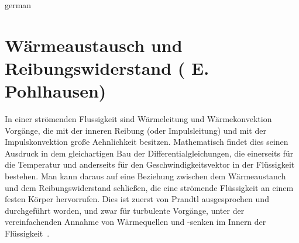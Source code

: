 \documentclass[captionpatch,colorlinks,upint,subscriptcorrection,varvw,mathalfa=cal=boondoxo,german]{asmeconf}
\begin{document}
\begin{selectlanguage}{german}%
\section{Wärmeaustausch und Reibungswiderstand ( E. Pohlhausen)}\label{app:pohlhausen}
In einer strömenden Flussigkeit sind Wärmeleitung und Wärmekonvektion Vorgänge, die mit der inneren Reibung (oder Impulsleitung) und mit der Impulskonvektion große Aehnlichkeit besitzen. Mathematisch findet dies seinen Ausdruck in dem gleichartigen Bau der Differentialgleichungen, die einerseits für die Temperatur und anderseits für den Geschwindigkeitsvektor in der Flüssigkeit bestehen. Man kann daraus auf eine Beziehung
zwischen dem Wärmeaustanch und dem Reibungswiderstand schließen, die eine strömende Flüssigkeit an einem festen Körper hervorrufen. Dies ist zuerst von Prandtl ausgesprochen und durchgeführt worden, und zwar für turbulente Vorgänge, unter der vereinfachenden Annahme von Wärmequellen und -senken im Innern der Flüssigkeit~\cite{pohlhausen1921}. 
\end{selectlanguage}%

\end{document}

